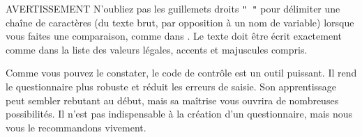 \begin{mybox}[colbacktitle=CAUTION]{\faFire{} AVERTISSEMENT}
N'oubliez pas les guillemets droits \textcolor{IMPORTANT}{\texttt{"\,"}} pour délimiter une chaîne de caractères (du texte brut, par opposition à un nom de variable) lorsque vous faites une comparaison, comme dans . Le texte doit être écrit exactement comme dans la liste des valeurs légales, accents et majuscules compris.
\end{mybox}

Comme vous pouvez le constater, le code de contrôle est un outil puissant. Il rend le questionnaire plus robuste et réduit les erreurs de saisie. Son apprentissage peut sembler rebutant au début, mais sa maîtrise vous ouvrira de nombreuses possibilités. Il n'est pas indispensable à la création d'un questionnaire, mais nous vous le recommandons vivement.
